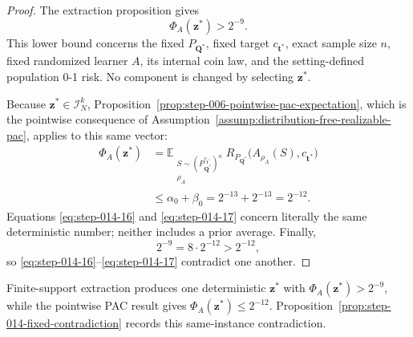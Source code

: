 \begin{proof}
The extraction proposition gives
\[
\Phi_A(\boldsymbol z^*)>2^{-9}.
\tag{S14.16}\label{eq:step-014-16}
\]
This lower bound concerns the fixed \(P_{\boldsymbol Q^*}\), fixed target
\(c_{\boldsymbol t^*}\), exact sample size \(n\), fixed randomized learner
\(A\), its internal coin law, and the setting-defined population 0-1 risk.
No component is changed by selecting \(\boldsymbol z^*\).

Because \(\boldsymbol z^*\in\mathcal I_N^k\), Proposition~\ref{prop:step-006-pointwise-pac-expectation}, which is the
pointwise consequence of Assumption~\ref{assump:distribution-free-realizable-pac},
applies to this same vector:
\[
\begin{aligned}
\Phi_A(\boldsymbol z^*)
&=\mathbb E_{\substack{
  S\sim(P_{\boldsymbol Q^*}^{c_{\boldsymbol t^*}})^n\\ \rho_A}}
  R_{P_{\boldsymbol Q^*}}\bigl(A_{\rho_A}(S),c_{\boldsymbol t^*}\bigr)\\
&\le\alpha_0+\beta_0
=2^{-13}+2^{-13}=2^{-12}.
\end{aligned}
\tag{S14.17}\label{eq:step-014-17}
\]
Equations \eqref{eq:step-014-16} and \eqref{eq:step-014-17} concern literally the same deterministic number;
neither includes a prior average. Finally,
\[
2^{-9}=8\cdot2^{-12}>2^{-12},
\tag{S14.18}\label{eq:step-014-18}
\]
so \eqref{eq:step-014-16}--\eqref{eq:step-014-17} contradict one another. \end{proof}
Finite-support extraction produces one deterministic $\boldsymbol z^*$
with $\Phi_A(\boldsymbol z^*)>2^{-9}$, while the pointwise PAC result gives
$\Phi_A(\boldsymbol z^*)\le2^{-12}$.  Proposition~\ref{prop:step-014-fixed-contradiction}
records this same-instance contradiction.

